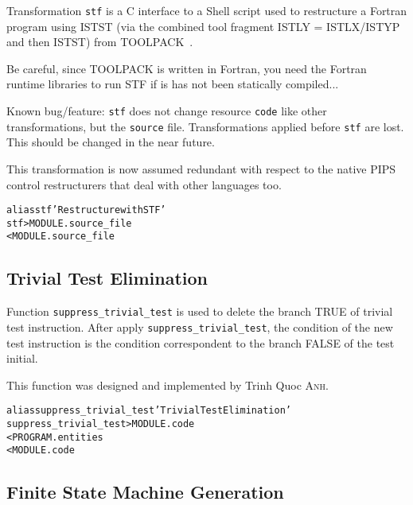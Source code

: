 \documentclass[a4paper]{report}
\newenvironment{PipsMake}{\begin{alltt}}{\end{alltt}}
\begin{document}
Transformation \texttt{stf} is a C interface to a Shell script used to
restructure a Fortran program using ISTST (via the combined tool
fragment ISTLY = ISTLX/ISTYP and then ISTST) from TOOLPACK~\cite{toolpack,Ost83}.

Be careful, since TOOLPACK is written in Fortran, you need the Fortran
runtime libraries to run STF if is has not been statically compiled...

Known bug/feature: \texttt{stf} does not change resource \texttt{code} like
other transformations, but the \texttt{source} file. Transformations
applied before \texttt{stf} are lost. This should be changed in the near
future.

This transformation is now assumed redundant with respect to the native
PIPS control restructurers that deal with other languages too.

\begin{PipsMake}
alias stf 'Restructure with STF'
stf                      > MODULE.source_file
        < MODULE.source_file
\end{PipsMake}

\subsection{Trivial Test Elimination}
\label{subsection-trivial-test-elimination}

Function \verb+suppress_trivial_test+ is used to delete the branch TRUE of
trivial test instruction. After apply \verb+suppress_trivial_test+, the condition of the
new test instruction is the condition correspondent to the branch FALSE of
the test initial.

This function was designed and implemented by Trinh Quoc \textsc{Anh}.

\begin{PipsMake}
alias suppress_trivial_test 'Trivial Test Elimination'
suppress_trivial_test          > MODULE.code
        < PROGRAM.entities
        < MODULE.code
\end{PipsMake}

\subsection{Finite State Machine Generation}
\label{subsection-fsm-generation}
\end{document}
